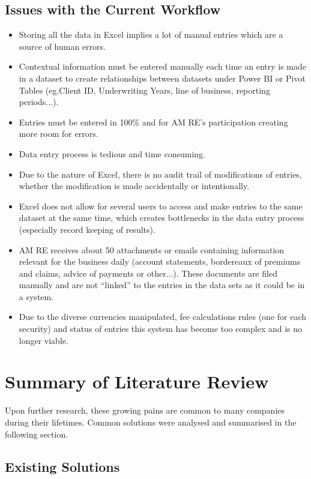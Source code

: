 \documentclass[12pt]{article}
\begin{document}
\subsection{Issues with the Current Workflow}
\begin{itemize}
    \item Storing all the data in Excel implies a lot of manual entries which are a source of human errors.
    \item Contextual information must be entered manually each time an entry is made in a dataset to create relationships between datasets under Power BI or Pivot Tables (eg.Client ID, Underwriting Years, line of business, reporting periods...).
    \item Entries must be entered in 100\% and for AM RE’s participation creating more room for errors.
    \item Data entry process is tedious and time consuming.

    \item Due to the nature of Excel, there is no audit trail of modifications of entries, whether the modification is made accidentally or intentionally.
    \item Excel does not allow for several users to access and make entries to the same dataset at the same time, which creates bottlenecks in the data entry process (especially record keeping of results).
    \item AM RE receives about 50 attachments or emails containing information relevant for the business daily (account statements, bordereaux of premiums and claims, advice of payments or other...). These documents are filed manually and are not “linked” to the entries in the data sets as it could be in a system.
    \item Due to the diverse currencies manipulated, fee calculations rules (one for each security) and status of entries this system has become too complex and is no longer viable.
\end{itemize}



\section{Summary of Literature Review}

Upon further research, these growing pains are common to many companies during their lifetimes. Common solutions were analysed and summarised in the following section.

\subsection{Existing Solutions}
\end{document}
